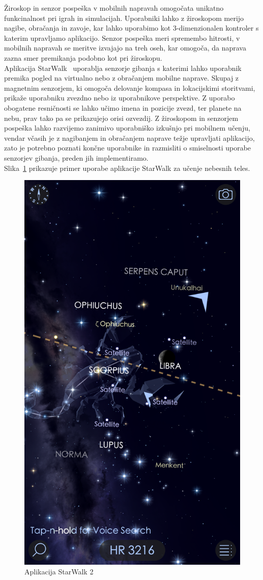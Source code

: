 \documentclass[a4paper, 12pt]{book}
\begin{document}
Žiroskop in senzor pospeška v mobilnih napravah omogočata unikatno funkcinalnost pri igrah in simulacijah. Uporabniki lahko z žiroskopom merijo nagibe, obračanja in zavoje, kar lahko uporabimo kot 3-dimenzionalen kontroler s katerim upravljamo aplikacijo. Senzor pospeška meri spremembo hitrosti, v mobilnih napravah se meritve izvajajo na treh oseh, kar omogoča, da naprava zazna smer premikanja podobno kot pri žiroskopu.\\Aplikacija StarWalk~\cite{starwalk} uporablja senzorje gibanja s katerimi lahko uporabnik premika pogled na virtualno nebo z obračanjem mobilne naprave. 
Skupaj z magnetnim senzorjem, ki omogoča delovanje kompasa in lokacijskimi storitvami, prikaže uporabniku zvezdno nebo iz uporabnikove perspektive. Z uporabo obogatene resničnosti se lahko učimo imena in pozicije zvezd, ter planete na nebu, prav tako pa se prikazujejo orisi ozvezdij.
Z žiroskopom in senzorjem pospeška lahko razvijemo zanimivo uporabniško izkušnjo pri mobilnem učenju, vendar včasih je z nagibanjem in obračanjem naprave težje upravljati aplikacijo, zato je potrebno poznati končne uporabnike in razmisliti o smiselnosti uporabe senzorjev gibanja, preden jih implementiramo.\\Slika~\ref{starwalkpic} prikazuje primer uporabe aplikacije StarWalk za učenje nebesnih teles.
\begin{figure}[H]
\centering
\includegraphics[height=0.8\textwidth]{slike/starwalk}
\caption{Aplikacija StarWalk 2}\label{starwalkpic}
\end{figure}
 
\end{document}
